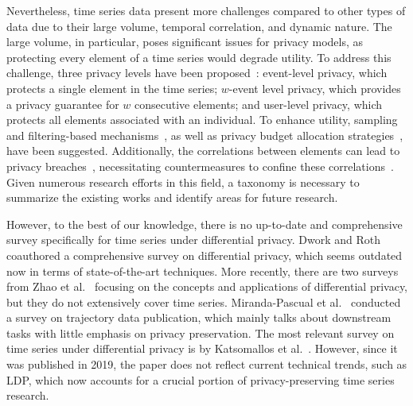 Nevertheless, time series data present more challenges compared to other types of data due to their large volume, temporal correlation, and dynamic nature. The large volume, in particular, poses significant issues for privacy models, as protecting every element of a time series would degrade utility. To address this challenge, three privacy levels have been proposed~\cite{Kellaris14}: event-level privacy, which protects a single element in the time series; $w$-event level privacy, which provides a privacy guarantee for $w$ consecutive elements; and user-level privacy, which protects all elements associated with an individual. To enhance utility, sampling and filtering-based mechanisms~\cite{fan2013adaptive}, as well as privacy budget allocation strategies~\cite{Kellaris14}, have been suggested. Additionally, the correlations between elements can lead to privacy breaches~\cite{shao2020structured}, necessitating countermeasures to confine these correlations~\cite{cao2017quantifying, xiao2017loclok}. Given numerous research efforts in this field,  a taxonomy is necessary to summarize the existing works and identify areas for future research.

However, to the best of our knowledge, there is no up-to-date and comprehensive survey specifically for time series under differential privacy. Dwork and Roth~\cite{dwork2014algorithmic} coauthored a comprehensive survey on differential privacy, which seems outdated now in terms of state-of-the-art techniques. More recently, there are two surveys from Zhao et al.~\cite{zhao2022survey, zhao2024scenario} focusing on the concepts and applications of differential privacy, but they do not extensively cover time series.
Miranda-Pascual et al.~\cite{miranda2023sok} conducted a survey on trajectory data publication, which mainly talks about downstream tasks with little emphasis on privacy preservation. %
The most relevant survey on time series under differential privacy is by Katsomallos et al.~\cite{katsomallos2019privacy}. However, since it was published in 2019, the paper does not reflect current technical trends, such as LDP, which now accounts for a crucial portion of privacy-preserving time series research. %


